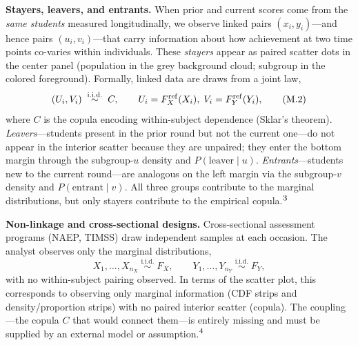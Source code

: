 \documentclass[10pt]{article}
\begin{document}
\begin{minipage}[t]{7.8in}
\begin{minipage}{7.4in}
    \vspace{6pt}
    \textbf{Stayers, leavers, and entrants.}\enspace
    When prior and current scores come from the \emph{same students} measured
    longitudinally, we observe linked pairs $(x_i, y_i)$---and hence pairs
    $(u_i, v_i)$---that carry information about how achievement at two time
    points co-varies within individuals. These \emph{stayers} appear as paired
    scatter dots in the center panel (population in the grey background cloud;
    subgroup in the colored foreground). Formally, linked data are draws from a
    joint law,
    \begin{equation}
      (U_i, V_i) \;\stackrel{\text{i.i.d.}}{\sim}\; C,
      \qquad
      U_i = F_X^{\mathrm{ref}}(X_i),\; V_i = F_Y^{\mathrm{ref}}(Y_i),
      \tag{M.2}
    \end{equation}
    where $C$ is the copula encoding within-subject dependence (Sklar's theorem).
    \emph{Leavers}---students present in the prior round but not the
    current one---do not appear in the interior scatter because they are unpaired;
    they enter the bottom margin through the subgroup-$u$ density and
    $P(\text{leaver}\mid u)$. \emph{Entrants}---students new to the current
    round---are analogous on the left margin via the subgroup-$v$ density and
    $P(\text{entrant}\mid v)$. All three groups contribute to the marginal
    distributions, but only stayers contribute to the empirical copula.$^{\mbox{\footnotesize{3}}}$

    \vspace{6pt}
    \textbf{Non-linkage and cross-sectional designs.}\enspace
    Cross-sectional assessment programs (NAEP, TIMSS) draw independent
    samples at each occasion. The analyst observes only the marginal
    distributions,
    \begin{equation}
      X_1,\dots,X_{n_X} \;\stackrel{\text{i.i.d.}}{\sim}\; F_X,
      \qquad
      Y_1,\dots,Y_{n_Y} \;\stackrel{\text{i.i.d.}}{\sim}\; F_Y,
      \tag{M.3}
    \end{equation}
    with no within-subject pairing observed. In terms of the scatter plot,
    this corresponds to observing only marginal information (CDF strips and
    density/proportion strips) with no paired interior scatter (copula).
    The coupling---the copula $C$ that would connect them---is entirely missing
    and must be supplied by an external model or
    assumption.$^{\mbox{\footnotesize{4}}}$


\end{minipage}
\end{minipage}
\end{document}
